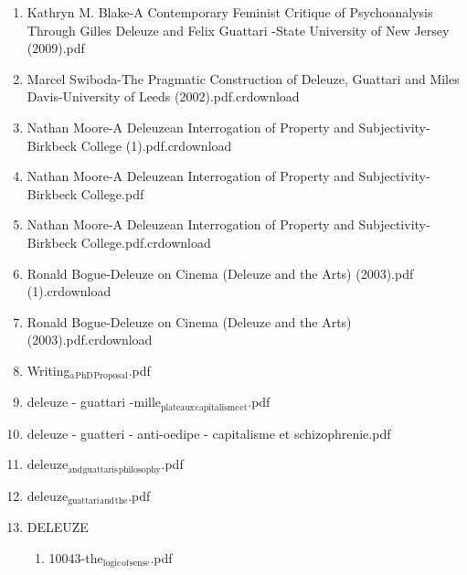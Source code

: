 \documentclass[11pt]{article}
\begin{document}
\begin{enumerate}
\begin{enumerate}
\item Kathryn M. Blake-A Contemporary Feminist Critique of Psychoanalysis Through Gilles Deleuze and Felix Guattari  -State University of New Jersey (2009).pdf
\label{sec-1-1-1-1-11-29-19-11}

\item Marcel Swiboda-The Pragmatic Construction of Deleuze, Guattari and Miles Davis-University of Leeds (2002).pdf.crdownload
\label{sec-1-1-1-1-11-29-19-12}

\item Nathan Moore-A Deleuzean Interrogation of Property and Subjectivity-Birkbeck College (1).pdf.crdownload
\label{sec-1-1-1-1-11-29-19-13}

\item Nathan Moore-A Deleuzean Interrogation of Property and Subjectivity-Birkbeck College.pdf
\label{sec-1-1-1-1-11-29-19-14}

\item Nathan Moore-A Deleuzean Interrogation of Property and Subjectivity-Birkbeck College.pdf.crdownload
\label{sec-1-1-1-1-11-29-19-15}

\item Ronald Bogue-Deleuze on Cinema (Deleuze and the Arts) (2003).pdf (1).crdownload
\label{sec-1-1-1-1-11-29-19-16}

\item Ronald Bogue-Deleuze on Cinema (Deleuze and the Arts) (2003).pdf.crdownload
\label{sec-1-1-1-1-11-29-19-17}

\item Writing$_{\text{a}}$$_{\text{PhD}}$$_{\text{Proposal}}$.pdf
\label{sec-1-1-1-1-11-29-19-18}

\item deleuze - guattari -mille$_{\text{plateaux}}$$_{\text{capitalisme}}$$_{\text{et}}$.pdf
\label{sec-1-1-1-1-11-29-19-19}

\item deleuze - guatteri - anti-oedipe - capitalisme et schizophrenie.pdf
\label{sec-1-1-1-1-11-29-19-20}

\item deleuze$_{\text{and}}$$_{\text{guattaris}}$$_{\text{philosophy}}$.pdf
\label{sec-1-1-1-1-11-29-19-21}

\item deleuze$_{\text{guattari}}$$_{\text{and}}$$_{\text{the}}$.pdf
\label{sec-1-1-1-1-11-29-19-22}

\item DELEUZE
\label{sec-1-1-1-1-11-29-19-23}
\begin{enumerate}
\item 10043-the$_{\text{logic}}$$_{\text{of}}$$_{\text{sense}}$.pdf
\label{sec-1-1-1-1-11-29-19-23-1}


\end{enumerate}
\end{enumerate}
\end{enumerate}
\end{document}
